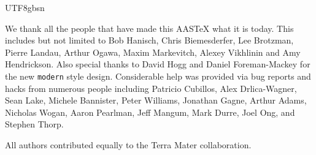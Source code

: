 \documentclass[trackchanges, twocolappendix, twocolumn]{aastex701}
\begin{document}
\begin{CJK*}{UTF8}{gbsn}
\begin{acknowledgments}
We thank all the people that have made this AASTeX what it is today.  This
includes but not limited to Bob Hanisch, Chris Biemesderfer, Lee Brotzman,
Pierre Landau, Arthur Ogawa, Maxim Markevitch, Alexey Vikhlinin and Amy
Hendrickson. Also special thanks to David Hogg and Daniel Foreman-Mackey
for the new {\tt\string modern} style design. Considerable help was provided via bug
reports and hacks from numerous people including Patricio Cubillos, Alex
Drlica-Wagner, Sean Lake, Michele Bannister, Peter Williams, Jonathan
Gagne, Arthur Adams, Nicholas Wogan, Aaron Pearlman, Jeff Mangum, Mark Durre, Joel Ong, and Stephen Thorp.
\end{acknowledgments}

\begin{contribution}

All authors contributed equally to the Terra Mater collaboration.


\end{contribution}

%


\end{CJK*}
\end{document}
